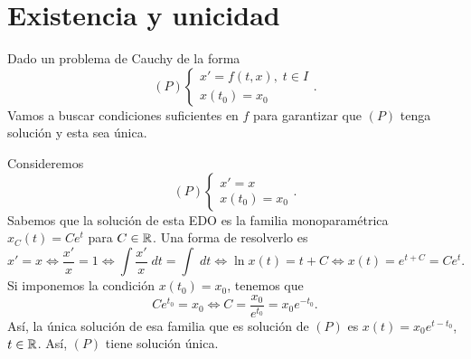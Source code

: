 \section{Existencia y unicidad}
Dado un problema de Cauchy de la forma
\[ \left(P\right)
\begin{cases}
x' = f\left(t,x\right) , \; t \in I \\
x\left(t_{0}\right) = x_{0}
\end{cases}
.\]
Vamos a buscar condiciones suficientes en $\displaystyle f $ para garantizar que $\displaystyle \left(P\right) $ tenga solución y esta sea única. 
\begin{eg}
Consideremos 
\[\left(P\right) 
\begin{cases}
x' = x \\
x\left(t_{0}\right) = x_{0}
\end{cases}
.\]
Sabemos que la solución de esta EDO es la familia monoparamétrica $\displaystyle x_{C}\left(t\right) = Ce^{t} $ para $\displaystyle C \in \mathbb{R} $. Una forma de resolverlo es
\[x' = x \iff \frac{x'}{x} = 1 \iff \int \frac{x'}{x} \; dt = \int  \; dt \iff \ln x\left(t\right) = t + C \iff x\left(t\right) = e^{t + C} = Ce^{t} .\]
Si imponemos la condición $\displaystyle x\left(t_{0}\right)=x_{0} $, tenemos que 
\[Ce^{t_{0}} = x_{0} \iff C = \frac{x_{0}}{e^{t_{0}}}=x_{0}e^{-t_{0}} .\]
Así, la única solución de esa familia que es solución de $\displaystyle \left(P\right) $ es $\displaystyle x\left(t\right)=x_{0}e^{t-t_{0}} $, $\displaystyle t \in \mathbb{R} $. Así, $\displaystyle \left(P\right) $ tiene solución única.
\end{eg}
